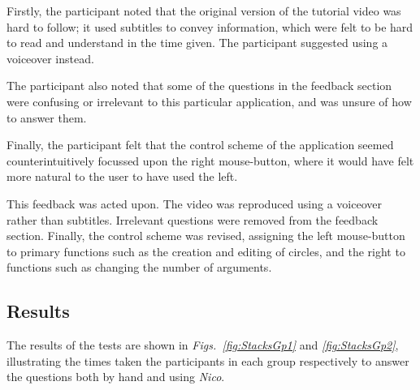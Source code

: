 \documentclass[12pt,twoside,notitlepage,xetex]{report}
\begin{document}
{Firstly, the participant noted that the original version of the tutorial video was hard to follow; it used subtitles to convey information, which were felt to be hard to read and understand in the time given.  The participant suggested using a voiceover instead.

The participant also noted that some of the questions in the feedback section were confusing or irrelevant to this particular application, and was unsure of how to answer them.

Finally, the participant felt that the control scheme of the application seemed counterintuitively focussed upon the right mouse-button, where it would have felt more natural to the user to have used the left.

This feedback was acted upon.  The video was reproduced using a voiceover rather than subtitles.  Irrelevant questions were removed from the feedback section.  Finally, the control scheme was revised, assigning the left mouse-button to primary functions such as the creation and editing of circles, and the right to functions such as changing the number of arguments.

\subsection{Results}

The results of the tests are shown in \emph{Figs.~\ref{fig:StacksGp1}} and \emph{\ref{fig:StacksGp2}}, illustrating the times taken the participants in each group respectively to answer the questions both by hand and using \emph{Nico}.

}
\end{document}
